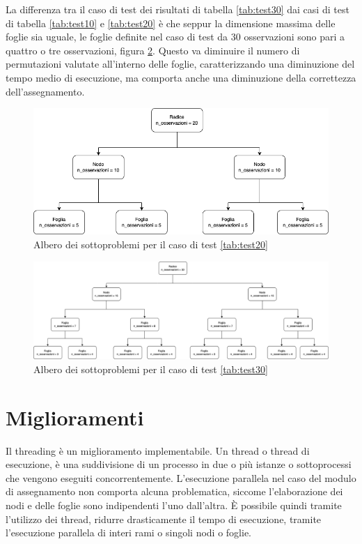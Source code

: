 \documentclass[a4paper,12pt]{report}
\begin{document}
La differenza tra il caso di test dei risultati di tabella \ref{tab:test30} dai casi di test di tabella \ref{tab:test10} e \ref{tab:test20} è che seppur la dimensione massima delle foglie sia uguale, le foglie definite nel caso di test da 30 osservazioni sono pari a quattro o tre osservazioni, figura \ref{fig:alberoTest30}. Questo va diminuire il numero di permutazioni valutate all'interno delle foglie, caratterizzando una diminuzione del tempo medio di esecuzione, ma comporta anche una diminuzione della correttezza dell'assegnamento.


\begin{figure}[H]
  \centering
  \includegraphics[scale=0.55]{img/utility/alberoTest20.png}
  \caption{Albero dei sottoproblemi per il caso di test \ref{tab:test20}}
  \label{fig:alberoTest20}
\end{figure}

\begin{figure}[H]
  \centering
  \includegraphics[scale=0.5,angle=90,origin=c]{img/utility/alberoTest30.png}
  \caption{Albero dei sottoproblemi per il caso di test \ref{tab:test30}}
  \label{fig:alberoTest30}
\end{figure}

\section{Miglioramenti}
Il threading è un miglioramento implementabile. Un thread o thread di esecuzione, è una suddivisione di un processo in due o più istanze o sottoprocessi che vengono eseguiti concorrentemente. L'esecuzione parallela nel caso del modulo di assegnamento non comporta alcuna problematica, siccome l'elaborazione dei nodi e delle foglie sono indipendenti l'uno dall'altra. È possibile quindi tramite l'utilizzo dei thread, ridurre drasticamente il tempo di esecuzione, tramite l'esecuzione parallela di interi rami o singoli nodi o foglie.
\end{document}
